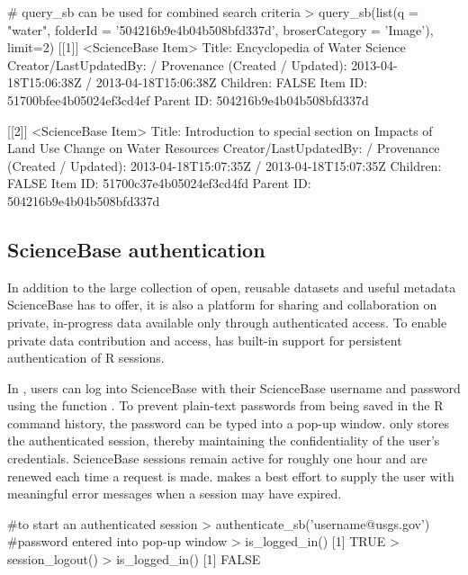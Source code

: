 \begin{example}

# query_sb can be used for combined search criteria
> query_sb(list(q = "water", folderId = '504216b9e4b04b508bfd337d', broserCategory = 'Image'), limit=2)
[[1]]
<ScienceBase Item>
  Title: Encyclopedia of Water Science
  Creator/LastUpdatedBy:      /
  Provenance (Created / Updated):  2013-04-18T15:06:38Z / 2013-04-18T15:06:38Z
  Children: FALSE
  Item ID: 51700bfee4b05024ef3cd4ef
  Parent ID: 504216b9e4b04b508bfd337d

[[2]]
<ScienceBase Item>
  Title: Introduction to special section on Impacts of Land Use Change on Water Resources
  Creator/LastUpdatedBy:      /
  Provenance (Created / Updated):  2013-04-18T15:07:35Z / 2013-04-18T15:07:35Z
  Children: FALSE
  Item ID: 51700c37e4b05024ef3cd4fd
  Parent ID: 504216b9e4b04b508bfd337d

\end{example}


\subsection{ScienceBase authentication}

In addition to the large collection of open, reusable datasets and
useful metadata ScienceBase has to offer, it is
also a platform for sharing and collaboration on private, in-progress
data available only through authenticated access. To enable
private data contribution and access,
 has built-in support for persistent
authentication of R sessions.

In , users can log into ScienceBase with their ScienceBase username
and password using the function . To prevent plain-text
passwords from being saved in the R command history, the password can be typed
into a pop-up window.  only stores the authenticated session,
thereby maintaining the confidentiality of the user's credentials. ScienceBase
sessions remain active for roughly one hour and are renewed each time a request
is made.  makes a best effort to supply the user with meaningful
error messages when a session may have expired.
\noindent\makebox[\linewidth]{\rule{\paperwidth}{0.4pt}}
\begin{example}
#to start an authenticated session
> authenticate_sb('username@usgs.gov') #password entered into pop-up window
> is_logged_in()
[1] TRUE
> session_logout()
> is_logged_in()
[1] FALSE
\end{example}

